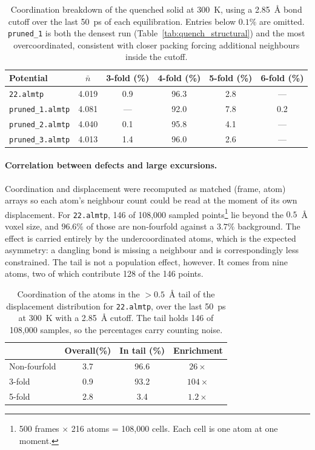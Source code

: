 \documentclass{article}
\begin{document}
\begin{table}[H]
    \centering
    \small
    \begin{tabular}{l|c|c|c|c|c}
        \toprule
        Potential & $\bar{n}$ & 3-fold (\%) & 4-fold (\%) & 5-fold (\%) & 6-fold (\%) \\
        \midrule
        \texttt{22.almtp}        & 4.019 & 0.9 & 96.3 & 2.8 & --- \\
        \texttt{pruned\_1.almtp} & 4.081 & --- & 92.0 & 7.8 & 0.2 \\
        \texttt{pruned\_2.almtp} & 4.040 & 0.1 & 95.8 & 4.1 & --- \\
        \texttt{pruned\_3.almtp} & 4.013 & 1.4 & 96.0 & 2.6 & --- \\
        \bottomrule
    \end{tabular}
    \caption{Coordination breakdown of the quenched solid at 300~K, using a 2.85~\AA{} bond cutoff over the last 50~ps of each equilibration. Entries below $0.1\%$ are omitted. \texttt{pruned\_1} is both the densest run (Table~\ref{tab:quench_structural}) and the most overcoordinated, consistent with closer packing forcing additional neighbours inside the cutoff.}
    \label{tab:defect_breakdown}
\end{table}

\paragraph{Correlation between defects and large excursions.}
Coordination and displacement were recomputed as matched (frame, atom) arrays so each atom's neighbour count could be read at the moment of its own displacement. For \texttt{22.almtp}, 146 of 108{,}000 sampled points\footnote{500 frames $\times$ 216 atoms = 108,000 cells. Each cell is one atom at one moment.} lie beyond the $0.5$~\AA{} voxel size, and $96.6\%$ of those are non-fourfold against a $3.7\%$ background. The effect is carried entirely by the undercoordinated atoms, which is the expected asymmetry: a dangling bond is missing a neighbour and is correspondingly less constrained. The tail is not a population effect, however. It comes from nine atoms, two of which contribute 128 of the 146 points.
\begin{table}[H]
    \centering
    \small
    \begin{tabular}{l|c|c|c}
        \toprule
        & Overall\footnotemark (\%) & In tail (\%) & Enrichment \\
        \midrule
        Non-fourfold & 3.7 & 96.6 & $26\times$ \\
        3-fold       & 0.9 & 93.2 & $104\times$ \\
        5-fold       & 2.8 & 3.4  & $1.2\times$ \\
        \bottomrule
    \end{tabular}
    \caption{Coordination of the atoms in the $>0.5$~\AA{} tail of the displacement distribution for \texttt{22.almtp}, over the last 50~ps at 300~K with a 2.85~\AA{} cutoff. The tail holds 146 of 108{,}000 samples, so the percentages carry counting noise.}
    \label{tab:defect_jump_correlation}
\end{table}
\end{document}
